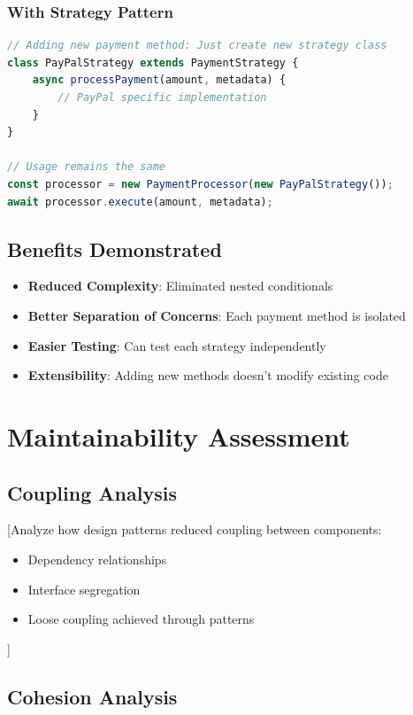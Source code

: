 \documentclass[a4paper,12pt]{report}
\begin{document}
\subsubsection{With Strategy Pattern}
\begin{lstlisting}[language=JavaScript, caption=With Pattern - Clean Abstraction]
// Adding new payment method: Just create new strategy class
class PayPalStrategy extends PaymentStrategy {
    async processPayment(amount, metadata) {
        // PayPal specific implementation
    }
}

// Usage remains the same
const processor = new PaymentProcessor(new PayPalStrategy());
await processor.execute(amount, metadata);
\end{lstlisting}

\subsection{Benefits Demonstrated}

\begin{itemize}
    \item \textbf{Reduced Complexity}: Eliminated nested conditionals
    \item \textbf{Better Separation of Concerns}: Each payment method is isolated
    \item \textbf{Easier Testing}: Can test each strategy independently
    \item \textbf{Extensibility}: Adding new methods doesn't modify existing code
\end{itemize}

\section{Maintainability Assessment}

\subsection{Coupling Analysis}

[Analyze how design patterns reduced coupling between components:
\begin{itemize}
    \item Dependency relationships
    \item Interface segregation
    \item Loose coupling achieved through patterns
\end{itemize}]

\subsection{Cohesion Analysis}
\end{document}
